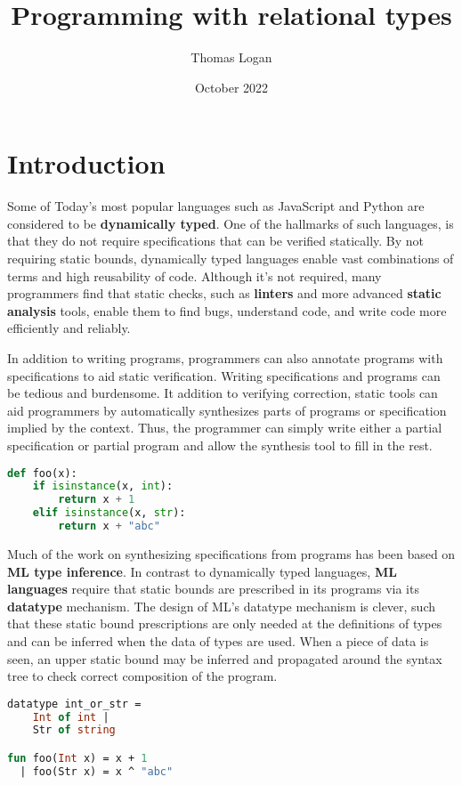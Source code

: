 \documentclass[sigplan,screen]{acmart}
\title{Programming with relational types}
\author{Thomas Logan}
\date{October 2022}
\begin{document}
\maketitle

\section{Introduction}
Some of Today's most popular languages such as JavaScript and Python are considered to be \textbf{dynamically typed}.
One of the hallmarks of such languages, is that they do not require specifications 
that can be verified statically. By not requiring static bounds, dynamically typed languages
enable vast combinations of terms and high reusability of code. 
Although it's not required, many programmers find that
static checks, such as \textbf{linters} and more advanced \textbf{static analysis} tools, 
enable them to find bugs, understand code, and write code more efficiently and reliably. 

In addition to writing programs, programmers can also annotate programs with specifications to
aid static verification. Writing specifications and programs can be tedious and burdensome.  
It addition to verifying correction, static tools can aid programmers by automatically synthesizes
parts of programs or specification implied by the context. Thus, the programmer can simply write
either a partial specification or partial program and allow the synthesis tool to fill in the rest.   

\begin{lstlisting}[language=Python]
def foo(x):
    if isinstance(x, int):
        return x + 1 
    elif isinstance(x, str): 
        return x + "abc"
\end{lstlisting}

Much of the work on synthesizing specifications from programs has been based on \textbf{ML type inference}.
In contrast to dynamically typed languages, \textbf{ML languages} require that static bounds are prescribed 
in its programs via its \textbf{datatype} mechanism. The design of ML's datatype mechanism is clever, 
such that these static bound prescriptions are only needed at the definitions of types and can be 
inferred when the data of types are used. When a piece of data is seen, an upper static bound 
may be inferred and propagated around the syntax tree to check correct composition of the program.

\begin{lstlisting}[language=ML]
datatype int_or_str = 
    Int of int | 
    Str of string

fun foo(Int x) = x + 1
  | foo(Str x) = x ^ "abc"
\end{lstlisting}
\end{document}
